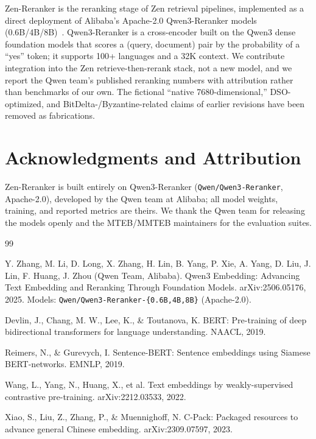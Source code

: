 \documentclass[11pt,letterpaper]{article}
\begin{document}
Zen-Reranker is the reranking stage of Zen retrieval pipelines, implemented as a direct
deployment of Alibaba's Apache-2.0 Qwen3-Reranker models (0.6B/4B/8B)~\cite{qwen3embedding}.
Qwen3-Reranker is a cross-encoder built on the Qwen3 dense foundation models that scores a
(query, document) pair by the probability of a ``yes'' token; it supports 100+ languages and
a 32K context. We contribute integration into the Zen retrieve-then-rerank stack, not a new
model, and we report the Qwen team's published reranking numbers with attribution rather than
benchmarks of our own. The fictional ``native 7680-dimensional,'' DSO-optimized, and
BitDelta-/Byzantine-related claims of earlier revisions have been removed as fabrications.

\section*{Acknowledgments and Attribution}

Zen-Reranker is built entirely on Qwen3-Reranker (\texttt{Qwen/Qwen3-Reranker}, Apache-2.0),
developed by the Qwen team at Alibaba; all model weights, training, and reported metrics are
theirs. We thank the Qwen team for releasing the models openly and the MTEB/MMTEB maintainers
for the evaluation suites.

\begin{thebibliography}{99}

Y. Zhang, M. Li, D. Long, X. Zhang, H. Lin, B. Yang, P. Xie, A. Yang, D. Liu, J. Lin,
F. Huang, J. Zhou (Qwen Team, Alibaba). Qwen3 Embedding: Advancing Text Embedding and
Reranking Through Foundation Models. arXiv:2506.05176, 2025.
Models: \texttt{Qwen/Qwen3-Reranker-\{0.6B,4B,8B\}} (Apache-2.0).

Devlin, J., Chang, M. W., Lee, K., \& Toutanova, K. BERT: Pre-training of deep bidirectional transformers for language understanding. NAACL, 2019.

Reimers, N., \& Gurevych, I. Sentence-BERT: Sentence embeddings using Siamese BERT-networks. EMNLP, 2019.

Wang, L., Yang, N., Huang, X., et al. Text embeddings by weakly-supervised contrastive pre-training. arXiv:2212.03533, 2022.

Xiao, S., Liu, Z., Zhang, P., \& Muennighoff, N. C-Pack: Packaged resources to advance general Chinese embedding. arXiv:2309.07597, 2023.

\end{thebibliography}
\end{document}
